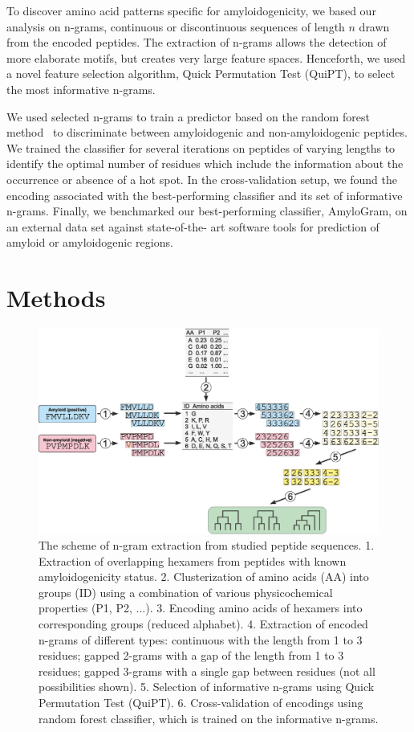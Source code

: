 \documentclass[fleqn,10pt,twoside]{gcb15submission}
\begin{document}
  To discover amino acid patterns specific for amyloidogenicity, we based our 
analysis on n-grams, continuous or discontinuous sequences of length $n$ drawn 
from the encoded peptides. The extraction of n-grams allows the detection of 
more elaborate motifs, but creates very large feature spaces. Henceforth, we 
used a novel feature selection algorithm, Quick Permutation Test (QuiPT), to 
select the most informative n-grams.

  We used selected n-grams to train a predictor based on the random forest 
method~\citep{breiman_random_2001} to discriminate between amyloidogenic and 
non-amyloidogenic peptides. We trained the classifier for several iterations on 
peptides of varying lengths to identify the optimal number of residues which 
include the information about the occurrence or absence of a hot spot. In the 
cross-validation setup, we found the encoding associated with the 
best-performing classifier and its set of informative n-grams. Finally, we 
benchmarked our best-performing classifier, AmyloGram, on an external data set 
against state-of-the- art software tools for prediction of amyloid or 
amyloidogenic regions.

\section{Methods}

\begin{figure}[bth]
\centerline{\includegraphics[width=0.82\linewidth]{figures/fig2.eps}} 
\caption{The scheme of n-gram extraction from studied peptide sequences. 
1. Extraction of overlapping hexamers from peptides with known 
amyloidogenicity status. 
2. Clusterization of amino acids (AA) into groups (ID) using a combination of various 
physicochemical properties (P1, P2, ...). 
3. Encoding amino acids of hexamers into corresponding groups (reduced alphabet). 
4. Extraction of encoded n-grams of different types: continuous with the length 
from 1 to 3 residues; gapped 2-grams with a gap of the length from 1 to 3 
residues; gapped 3-grams with a single gap between residues (not all 
possibilities shown).
5. Selection of informative n-grams using Quick Permutation Test (QuiPT).
6. Cross-validation of encodings using random forest classifier, which is trained on the informative n-grams.}\label{fig:ngram_scheme} 
\end{figure}
\end{document}
